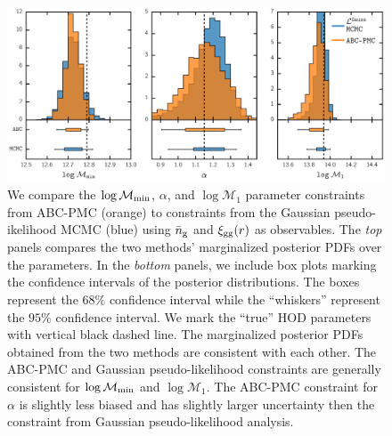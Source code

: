 \begin{figure}
\includegraphics[width=1.\textwidth]{figs/abc/paper_ABCvsMCMC_nbarxi.pdf}
\caption{\label{fig:hist_nbarxi} 
We compare the $\log \mathcal{M}_{\rm min}$, $\alpha$, and $\log \mathcal{M}_{1}$ parameter 
constraints from ABC-PMC (orange) to constraints from the Gaussian pseudo-ikelihood MCMC (blue) 
using $\bar{n}_{\mathrm{g}}$ and $\xi_{\mathrm{gg}}(r)$ as observables. The \emph{top} panels compares the two methods' 
marginalized posterior PDFs over the parameters. In the \emph{bottom} panels, we include box 
plots marking the confidence intervals of the posterior distributions. The boxes represent the 
$68\%$ confidence interval while the ``whiskers'' represent the $95\%$ confidence interval. We mark 
the ``true'' HOD parameters with vertical black dashed line. The marginalized posterior PDFs 
obtained from the two methods are consistent with each other. The ABC-PMC and Gaussian pseudo-likelihood
constraints are generally consistent for $\log \mathcal{M}_{\rm min}$ and $\log \mathcal{M}_{1}$. 
The ABC-PMC constraint for $\alpha$ is slightly less biased and has slightly larger uncertainty
then the constraint from Gaussian pseudo-likelihood analysis.} 
\end{figure}

